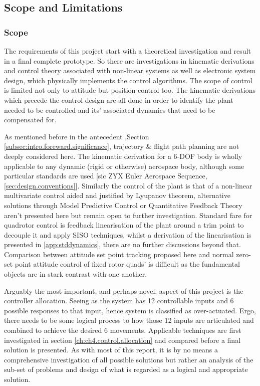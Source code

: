 \subsection{Scope and Limitations}
\label{subsec:intro.foreward.scopeandlim}
\subsubsection{Scope}
\label{subsubsec:intro.foreward.scope}
The requirements of this project start with a theoretical investigation and result in a final complete prototype. So there are investigations in kinematic derivations and control theory associated with non-linear systems as well as electronic system design, which physically implements the control algorithms. The scope of control is limited not only to attitude but position control too. The kinematic derivations which precede the control design are all done in order to identify the plant needed to be controlled and its' associated dynamics that need to be compensated for.
\par
As mentioned before in the antecedent ,Section \ref{subsec:intro.foreward.significance}, trajectory \& flight path planning are not deeply considered here. The kinematic derivation for a 6-DOF body is wholly applicable to any dynamic (rigid or otherwise) aerospace body, although some particular standards are used [sic ZYX Euler Aerospace Sequence, \ref{sec:design.conventions}]. Similarly the control of the plant is that of a non-linear multivariate control aided and justified by Lyupanov theorem, alternative solutions through Model Predictive Control or Quantitative Feedback Theory aren't presented here but remain open to further investigation. Standard fare for quadrotor control is feedback linearisation of the plant around a trim point to decouple it and apply SISO techniques, whilst a derivation of the linearisation is presented in \ref{app:stddynamics}, there are no further discussions beyond that. Comparison between attitude set point tracking proposed here and normal zero-set point attitude control of fixed rotor quads' is difficult as the fundamental objects are in stark contrast with one another.
\par
Arguably the most important, and perhaps novel, aspect of this project is the controller allocation. Seeing as the system has 12 controllable inputs and 6 possible responses to that input, hence system is classified as over-actuated. Ergo, there needs to be some logical process to how those 12 inputs are articulated and combined to achieve the desired 6 movements. Applicable techniques are first investigated in section \ref{ch:ch4.control.allocation} and compared before a final solution is presented. As with most of this report, it is by no means a comprehensive investigation of all possible solutions but rather an analysis of the sub-set of problems and design of what is regarded as a logical and appropriate solution.
